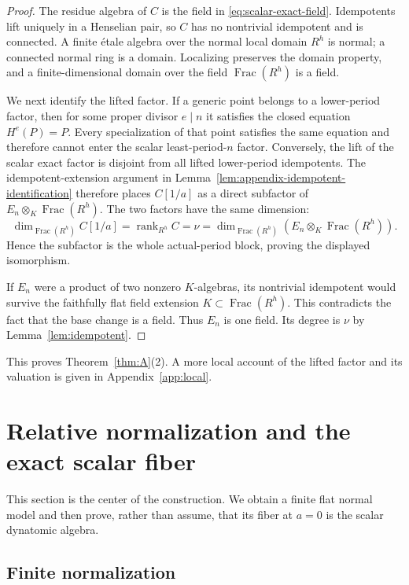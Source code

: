 \documentclass[11pt]{article}
\theoremstyle{definition}
\theoremstyle{remark}
\newcommand{\Frac}{\operatorname{Frac}}
\newcommand{\etale}{\'{e}tale}
\begin{document}
\begin{proof}
The residue algebra of $C$ is the field in
\eqref{eq:scalar-exact-field}.  Idempotents lift uniquely in a Henselian
pair, so $C$ has no nontrivial idempotent and is connected.  A finite
\etale{} algebra over the normal local domain $R^h$ is normal; a connected
normal ring is a domain.  Localizing preserves the domain property, and a
finite-dimensional domain over the field $\Frac(R^h)$ is a field.

We next identify the lifted factor.  If a generic point belongs to a
lower-period factor, then for some proper divisor $e\mid n$ it satisfies the
closed equation $H^e(P)=P$.  Every specialization of that point satisfies
the same equation and therefore cannot enter the scalar least-period-$n$
factor.  Conversely, the lift of the scalar exact factor is disjoint from
all lifted lower-period idempotents.  The idempotent-extension argument in
Lemma~\ref{lem:appendix-idempotent-identification} therefore places
$C[1/a]$ as a direct subfactor of
$E_n\otimes_K\Frac(R^h)$.  The two factors have the same dimension:
\[
 \dim_{\Frac(R^h)}C[1/a]=\operatorname{rank}_{R^h}C=\nu
 =\dim_{\Frac(R^h)}(E_n\otimes_K\Frac(R^h)).
\]
Hence the subfactor is the whole actual-period block, proving the displayed
isomorphism.

If $E_n$ were a product of two nonzero $K$-algebras, its nontrivial
idempotent would survive the faithfully flat field extension
$K\subset\Frac(R^h)$.  This contradicts the fact that the base change is a
field.  Thus $E_n$ is one field.  Its degree is $\nu$ by
Lemma~\ref{lem:idempotent}.
\end{proof}

This proves Theorem~\ref{thm:A}(2).  A more local account of the lifted
factor and its valuation is given in Appendix~\ref{app:local}.

\section{Relative normalization and the exact scalar fiber}\label{sec:normalization}

This section is the center of the construction.  We obtain a finite flat
normal model and then prove, rather than assume, that its fiber at
$a=0$ is the scalar dynatomic algebra.

\subsection{Finite normalization}
\end{document}
